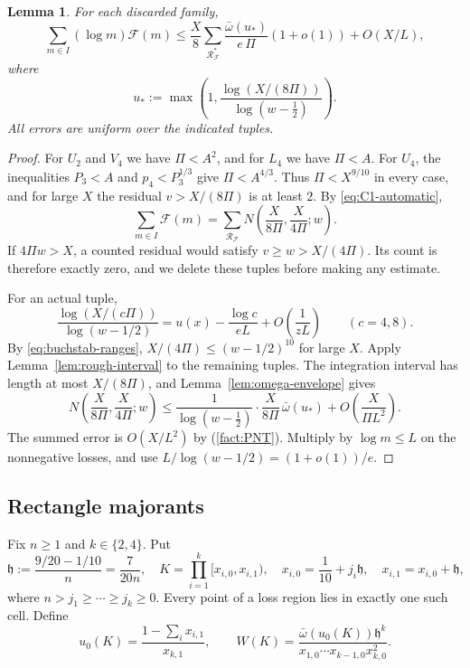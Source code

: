\documentclass{amsart}
\newtheorem{lemma}{Lemma}[section]
\newcounter{fact}
\numberwithin{equation}{section}
\numberwithin{table}{section}
\begin{document}
\begin{lemma}\label{lem:loss-reduction}
For each discarded family,
\begin{equation}\label{eq:loss-reduction}
\sum_{m\in I}(\log m)\mathcal F(m)
\le\frac X8\sum_{\mathcal R_{\mathcal F}^{*}}
\frac{\bar\omega(u_*)}{e\,\Pi}(1+o(1))+O(X/L),
\end{equation}
where
\[
u_*:=\max\left(1,
\frac{\log(X/(8\Pi))}{\log(w-\frac12)}\right).
\]
All errors are uniform over the indicated tuples.
\end{lemma}

\begin{proof}
For $U_2$ and $V_4$ we have $\Pi<A^2$, and for $L_4$ we have $\Pi<A$.
For $U_4$, the inequalities $P_3<A$ and $p_4<P_3^{1/3}$ give
$\Pi<A^{4/3}$.
Thus $\Pi<X^{9/10}$ in every case, and for large $X$ the residual
$v>X/(8\Pi)$ is at least $2$. By \eqref{eq:C1-automatic},
\begin{equation}\label{eq:loss-exact-count}
\sum_{m\in I}\mathcal F(m)
=\sum_{\mathcal R_{\mathcal F}}
N\left(\frac X{8\Pi},\frac X{4\Pi};w\right).
\end{equation}
If $4\Pi w>X$, a counted residual would satisfy
$v\ge w>X/(4\Pi)$.
Its count is therefore exactly zero, and we delete these tuples before
making any estimate.

For an actual tuple,
\begin{equation}\label{eq:finite-buchstab-parameters}
\frac{\log(X/(c\Pi))}{\log(w-1/2)}
=u(x)-\frac{\log c}{eL}+O\left(\frac1{zL}\right)
\qquad(c=4,8).
\end{equation}
By \eqref{eq:buchstab-ranges}, $X/(4\Pi)\le(w-1/2)^{10}$ for large $X$.
Apply Lemma~\ref{lem:rough-interval} to the remaining tuples. The
integration interval has length at most $X/(8\Pi)$, and
Lemma~\ref{lem:omega-envelope} gives
\[
N\left(\frac X{8\Pi},\frac X{4\Pi};w\right)
\le\frac1{\log(w-\frac12)}\cdot\frac X{8\Pi}\,
\bar\omega(u_*)+O\left(\frac X{\Pi L^2}\right).
\]
The summed error is $O(X/L^2)$ by (\ref{fact:PNT}).
Multiply by $\log m\le L$ on the nonnegative losses, and use
$L/\log(w-1/2)=(1+o(1))/e$.
\end{proof}

\subsection{Rectangle majorants}

Fix $n\ge1$ and $k\in\{2,4\}$. Put
\[
\mathfrak h:=\frac{9/20-1/10}{n}=\frac7{20n},\quad
K=\prod_{i=1}^k[x_{i,0},x_{i,1}),\quad
x_{i,0}=\frac1{10}+j_i\mathfrak h,\quad
x_{i,1}=x_{i,0}+\mathfrak h,
\]
where $n>j_1\ge\cdots\ge j_k\ge0$.
Every point of a loss region lies in exactly one such cell. Define
\begin{equation}\label{eq:cell-majorant}
u_0(K)=\frac{1-\sum_i x_{i,1}}{x_{k,1}},\qquad
W(K)=\frac{\bar\omega(u_0(K))\mathfrak h^k}
{x_{1,0}\cdots x_{k-1,0}x_{k,0}^2}.
\end{equation}
\end{document}
